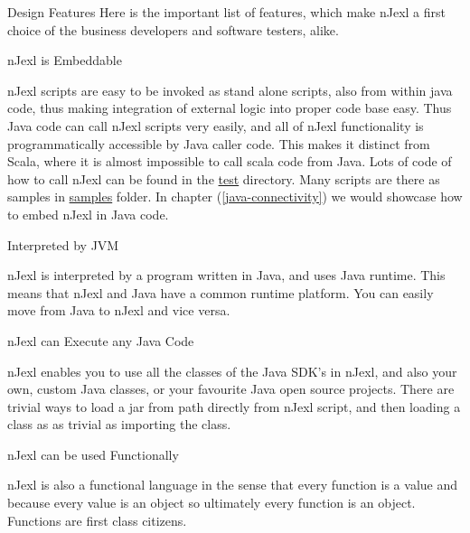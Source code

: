\begin{section}{Design Features}
Here is the important list of features, which make nJexl a first choice of the business developers and software testers, alike.

\begin{subsection}{nJexl is Embeddable}

nJexl scripts are easy to be invoked as stand alone scripts, also from within java code, 
thus making integration of external logic into proper code base easy. Thus Java code
can call nJexl scripts very easily, and all of nJexl functionality is programmatically 
accessible by Java caller code. This makes it distinct from Scala, where it is almost impossible
to call scala code from Java. Lots of code of how to call nJexl can be found 
in the \href{https://github.com/nmondal/njexl/tree/master/lang/src/test/java/com/noga/njexl/lang}{test} directory. 
Many scripts are there as samples in \href{https://github.com/nmondal/njexl/tree/master/lang/samples}{samples} folder.
In chapter (\ref{java-connectivity}) we would showcase how to embed nJexl in Java code.
\end{subsection}

\begin{subsection}{Interpreted by JVM}

nJexl is interpreted by a program written in Java, and uses Java runtime. 
This means that nJexl and Java have a common runtime platform. 
You can easily move from Java to nJexl and vice versa.

\end{subsection}

\begin{subsection}{nJexl can Execute any Java Code}

nJexl enables you to use all the classes of the Java SDK's in nJexl, and also your own, custom Java classes, or your favourite Java open source projects. There are trivial ways to load a jar from path directly from nJexl script, and then loading a class as as trivial 
as importing the class.

\end{subsection}


\begin{subsection}{nJexl can be used Functionally}

nJexl is also a functional language in the sense that every function is a value and because every value is an object so ultimately every function is an object. Functions are first class citizens.


\end{subsection}
\end{section}
